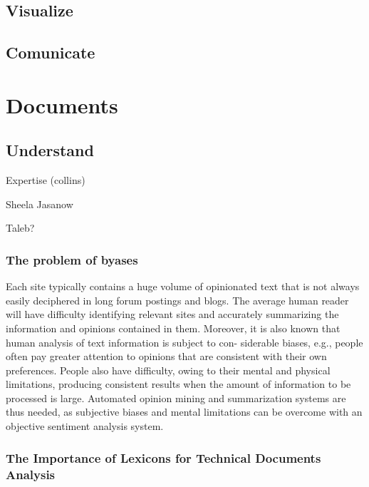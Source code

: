 \documentclass[]{book}
\begin{document}
\subsection{Visualize}\label{sotatoolsvisualize}

\subsection{Comunicate}\label{sotatoolscomunicate}

\section{Documents}\label{sotadocuments}

\subsection{Understand}\label{sotadocumentsunderstand}

Expertise (collins)

Sheela Jasanow

Taleb?

\subsubsection{The problem of byases}\label{sotadocumentsunderstandbyas}

Each site typically contains a huge volume of opinionated text that is
not always easily deciphered in long forum postings and blogs. The
average human reader will have difficulty identifying relevant sites and
accurately summarizing the information and opinions contained in them.
Moreover, it is also known that human analysis of text information is
subject to con- siderable biases, e.g., people often pay greater
attention to opinions that are consistent with their own preferences.
People also have difficulty, owing to their mental and physical
limitations, producing consistent results when the amount of information
to be processed is large. Automated opinion mining and summarization
systems are thus needed, as subjective biases and mental limitations can
be overcome with an objective sentiment analysis system.

\subsubsection{The Importance of Lexicons for Technical Documents
Analysis}\label{sotadocumentsunderstandlexicons}
\end{document}
